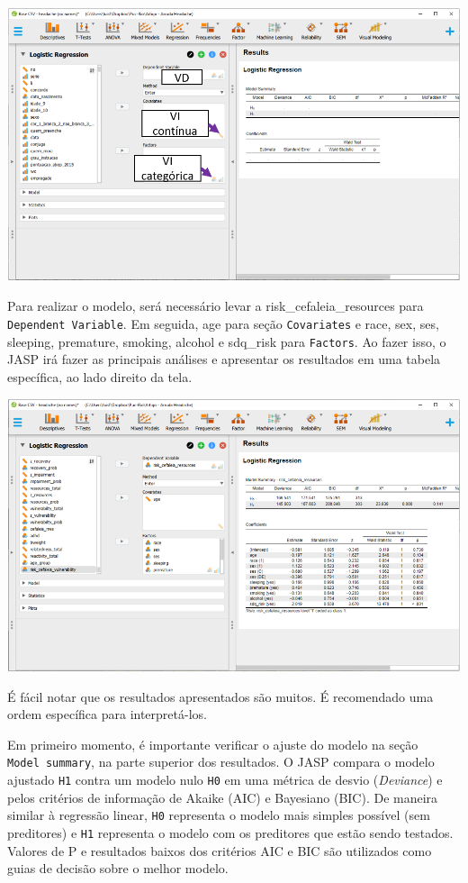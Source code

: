 \documentclass[
]{book}
\begin{document}
\includegraphics{./img/cap_logistica_interface.png}

Para realizar o modelo, será necessário levar a risk\_cefaleia\_resources para \texttt{Dependent\ Variable}. Em seguida, age para seção \texttt{Covariates} e race, sex, ses, sleeping, premature, smoking, alcohol e sdq\_risk para \texttt{Factors}. Ao fazer isso, o JASP irá fazer as principais análises e apresentar os resultados em uma tabela específica, ao lado direito da tela.

\includegraphics{./img/cap_logistica_resultado_0.png}

É fácil notar que os resultados apresentados são muitos. É recomendado uma ordem específica para interpretá-los.

Em primeiro momento, é importante verificar o ajuste do modelo na seção \texttt{Model\ summary}, na parte superior dos resultados. O JASP compara o modelo ajustado \texttt{H1} contra um modelo nulo \texttt{H0} em uma métrica de desvio (\emph{Deviance}) e pelos critérios de informação de Akaike (AIC) e Bayesiano (BIC). De maneira similar à regressão linear, \texttt{H0} representa o modelo mais simples possível (sem preditores) e \texttt{H1} representa o modelo com os preditores que estão sendo testados. Valores de P e resultados baixos dos critérios AIC e BIC são utilizados como guias de decisão sobre o melhor modelo.
\end{document}
